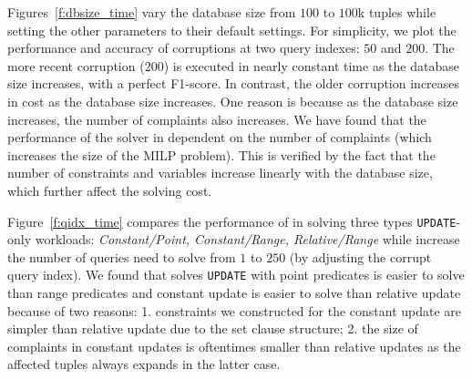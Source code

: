 Figures~\ref{f:dbsize_time} vary the database size from $100$ to $100$k tuples while setting the other parameters to their default settings.
For simplicity, we plot the performance and accuracy of corruptions at two query indexes: $50$ and $200$.
The more recent corruption ($200$) is executed in nearly constant time as the database size increases, with a perfect F1-score.
In contrast, the older corruption increases in cost as the database size increases.  One reason is because as the database size increases, the
number of complaints also increases.  We have found that the performance of the solver in dependent on the number of complaints (which
increases the size of the MILP problem).  This is verified by the fact that the number of constraints and variables increase linearly with the database size, which further affect the solving cost.

Figure~\ref{f:qidx_time} compares the performance of \sys in solving three types \texttt{UPDATE}-only workloads: {\it Constant/Point, Constant/Range, Relative/Range} while increase the number of queries \sys need to solve from $1$ to $250$ (by adjusting the corrupt query index). We found that \sys solves \texttt{UPDATE} with point predicates is easier to solve than range predicates and constant update is 
easier to solve than relative update because of two reasons: 1. constraints we constructed for the constant update are simpler than relative update due to the set clause structure; 2. the size of complaints in constant updates is oftentimes smaller than relative updates as the affected tuples always expands in the latter case. 

